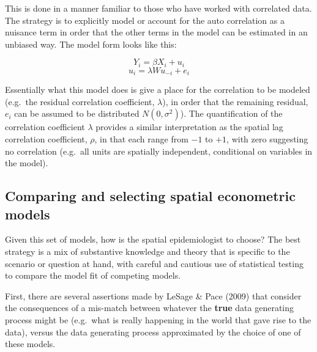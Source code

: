 \documentclass[
]{book}
\begin{document}
This is done in a manner familiar to those who have worked with correlated data. The strategy is to explicitly model or account for the auto correlation as a nuisance term in order that the other terms in the model can be estimated in an unbiased way. The model form looks like this:

\[Y_i=\beta X_i+ u_i\]
\[u_i=\lambda Wu_{-i} + e_i\]

Essentially what this model does is give a place for the correlation to be modeled (e.g.~the residual correlation coefficient, \(\lambda\)), in order that the remaining residual, \(e_i\) can be assumed to be distributed \(N(0, \sigma^2)\)). The quantification of the correlation coefficient \(\lambda\) provides a similar interpretation as the spatial lag correlation coefficient, \(\rho\), in that each range from \(-1\) to \(+1\), with zero suggesting no correlation (e.g.~all units are spatially independent, conditional on variables in the model).

\hypertarget{comparing-and-selecting-spatial-econometric-models}{%
\subsection{Comparing and selecting spatial econometric models}\label{comparing-and-selecting-spatial-econometric-models}}

Given this set of models, how is the spatial epidemiologist to choose? The best strategy is a mix of substantive knowledge and theory that is specific to the scenario or question at hand, with careful and cautious use of statistical testing to compare the model fit of competing models.

First, there are several assertions made by LeSage \& Pace (2009) that consider the consequences of a mis-match between whatever the \textbf{true} data generating process might be (e.g.~what is really happening in the world that gave rise to the data), versus the data generating process approximated by the choice of one of these models.
\end{document}
